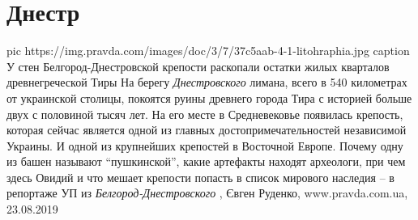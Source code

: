  
 
 
 
 
\chapter{Днестр}
\label{sec:slova.dnestr}

\ifcmt
  pic https://img.pravda.com/images/doc/3/7/37c5aab-4-1-litohraphia.jpg
	caption У стен Белгород-Днестровской крепости раскопали остатки жилых кварталов древнегреческой Тиры
\fi
На берегу \emph{Днестровского} лимана, всего в 540 километрах от украинской
столицы, покоятся руины древнего города Тира с историей больше двух с половиной
тысяч лет. На его месте в Средневековье появилась крепость, которая сейчас
является одной из главных достопримечательностей независимой Украины. И одной
из крупнейших крепостей в Восточной Европе. Почему одну из башен называют
\enquote{пушкинской}, какие артефакты находят археологи, при чем здесь Овидий и
что мешает крепости попасть в список мирового наследия – в репортаже УП из
\emph{Белгород-Днестровского}
, 
Євген Руденко, www.pravda.com.ua, 23.08.2019

